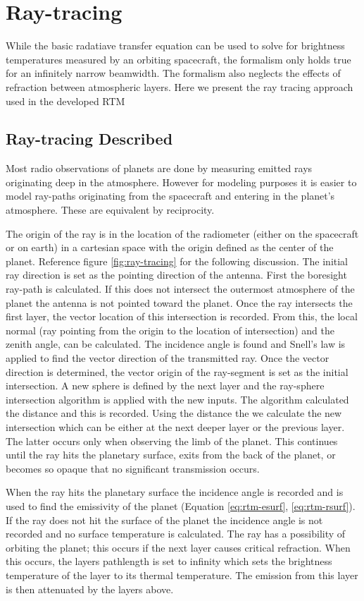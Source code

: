 \section{Ray-tracing}
While the basic radatiave transfer equation can be used to solve for brightness temperatures measured by an orbiting spacecraft, the formalism only holds true for an infinitely narrow beamwidth. The formalism also neglects the effects of refraction between atmospheric layers. Here we present the ray tracing approach used in the developed RTM \cite{Hoffman-thesis}
\subsection{Ray-tracing Described}
Most radio observations of planets are done by measuring emitted rays originating deep in the atmosphere. However for modeling purposes it is easier to model ray-paths originating from the spacecraft and entering in the planet's atmosphere. These are equivalent by reciprocity.

The origin of the ray is in the location of the radiometer (either on the spacecraft or on earth) in a cartesian space with the origin defined as the center of the planet. Reference figure \ref{fig:ray-tracing} for the following discussion. The initial ray direction is set as the pointing direction of the antenna. First the boresight ray-path is calculated. If this does not intersect the outermost atmosphere of the planet the antenna is not pointed toward the planet. Once the ray intersects the first layer, the vector location of this intersection is recorded. From this, the local normal (ray pointing from the origin to the location of intersection) and the zenith angle, can be calculated. The incidence angle is found and Snell's law is applied to find the vector direction of the transmitted ray. Once the vector direction is determined, the vector origin of the ray-segment is set as the initial intersection. A new sphere is defined by the next layer and the ray-sphere intersection algorithm is applied with the new inputs. The algorithm calculated the distance and this is recorded. Using the distance the we calculate the new intersection which can be either at the next deeper layer or the previous layer. The latter occurs only when observing the limb of the planet. This continues until the ray hits the planetary surface, exits from the back of the planet, or becomes so opaque that no significant transmission occurs. 

When the ray hits the planetary surface the incidence angle is recorded and is used to find the emissivity of the planet (Equation \ref{eq:rtm-esurf}, \ref{eq:rtm-rsurf}). If the ray does not hit the surface of the planet the incidence angle is not recorded and no surface temperature is calculated. The ray has a possibility of orbiting the planet; this occurs if the next layer causes critical refraction. When this occurs, the layers pathlength is set to infinity which sets the brightness temperature of the layer to its thermal temperature. The emission from this layer is then attenuated by the layers above.

